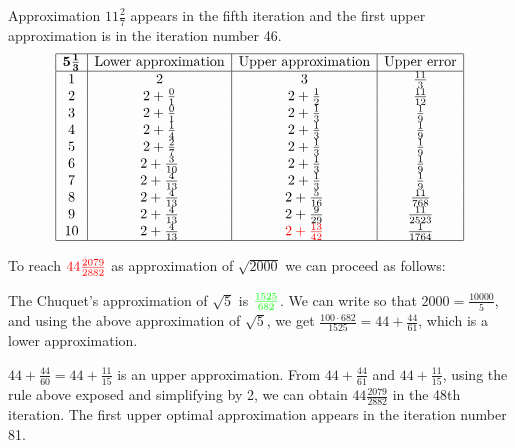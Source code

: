 \documentclass{amsart}
\begin{document}
   Approximation $11\frac{2}{7}$ appears in the fifth iteration and the first upper approximation is in the iteration number 46.
$$\begin{array}{|c|c|c|c|}
 \hline
 {\bf 5 \frac{1}{3}}&\text{Lower approximation}&\text{Upper approximation}&\text{Upper error}\\
 \hline
 1&2&3&\frac{11}{3}\\
2&2+\frac{0}{1}&2+\frac{1}{2}&\frac{11}{12}\\
3&2+\frac{0}{1}&2+\frac{1}{3}&\frac{1}{9}\\
4&2+\frac{1}{4}&2+\frac{1}{3}&\frac{1}{9}\\
5&2+\frac{2}{7}&2+\frac{1}{3}&\frac{1}{9}\\
6&2+\frac{3}{10}&2+\frac{1}{3}&\frac{1}{9}\\
7&2+\frac{4}{13}&2+\frac{1}{3}&\frac{1}{9}\\
8&2+\frac{4}{13}&2+\frac{5}{16}&\frac{11}{768}\\
9&2+\frac{4}{13}&2+\frac{9}{29}&\frac{11}{2523}\\
10&2+\frac{4}{13}&{\color{red}2+\frac{13}{42}}&\frac{1}{1764}\\
 \hline
\end{array}$$

\newpage

To reach ${\color{red}44\frac{2079}{2882}}$ as approximation of  $\sqrt{2000}$ we can proceed as follows:

The Chuquet's approximation of $\sqrt{5}$ is ${\color{green}\frac{1525}{682}}$. We can write so that $2000=\frac{10000}{5}$, and using the above approximation of $\sqrt{5}$, we get $\frac{100\cdot 682}{1525}=44+\frac{44}{61}$, which is a lower approximation.

$44+\frac{44}{60}=44+\frac{11}{15}$ is an upper approximation. From $44+\frac{44}{61}$ and $44+\frac{11}{15}$, using the rule above exposed and simplifying by 2, we can obtain  $44\frac{2079}{2882}$ in the 48th iteration. The first upper optimal approximation appears in the iteration number 81.
\end{document}
